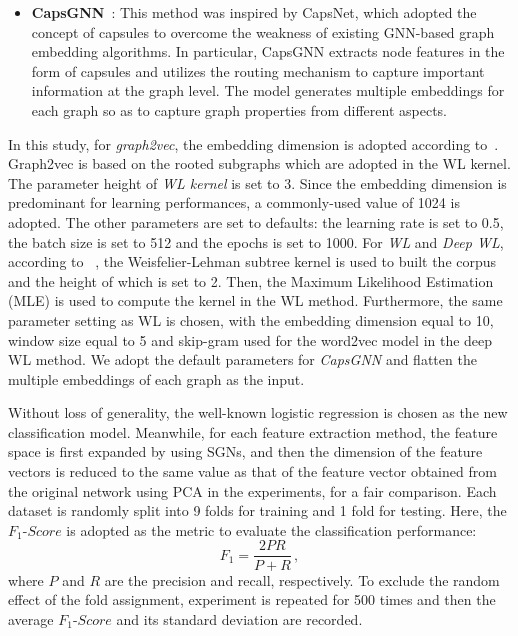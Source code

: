 \documentclass[10pt,journal,compsoc]{IEEEtran}
\begin{document}
\begin{itemize}
\item \textbf{CapsGNN}~\cite{xinyi2018capsule}: This method was inspired by CapsNet, which adopted the concept of capsules to overcome the weakness of existing GNN-based graph embedding algorithms. In particular, CapsGNN extracts node features in the form of capsules and utilizes the routing mechanism to capture important information at the graph level. The model generates multiple embeddings for each graph so as to capture graph properties from different aspects.
\end{itemize}



In this study, for \emph{graph2vec}, the embedding dimension is adopted  according to~\cite{narayanan2017graph2vec}. Graph2vec is based on the rooted subgraphs which are adopted in the WL kernel. The parameter height of \emph{WL kernel} is set to 3. Since the embedding dimension is predominant for learning performances, a commonly-used value of 1024 is adopted. The other parameters are set to defaults: the learning rate is set to 0.5, the batch size is set to 512 and the epochs is set to 1000. For \emph{WL} and \emph{Deep WL}, according to ~\cite{yanardag2015deep}, the Weisfelier-Lehman subtree kernel is used to built the corpus and the height of which is set to 2. Then, the Maximum Likelihood Estimation (MLE) is used to compute the kernel in the WL method. Furthermore, the same parameter setting as WL is chosen, with the embedding dimension equal to 10, window size equal to 5 and skip-gram used for the word2vec model in the deep WL method. We adopt the default parameters for \emph{CapsGNN} and flatten the multiple embeddings of each graph as the input.

Without loss of generality, the well-known logistic regression is chosen as the new classification model. Meanwhile, for each feature extraction method, the feature space is first expanded by using SGNs, and then the dimension of the feature vectors is reduced to the same value as that of the feature vector obtained from the original network using PCA in the experiments, for a fair comparison. Each dataset is randomly split into 9 folds for training and 1 fold for testing. Here, the $F_1$-$Score$ is adopted as the metric to evaluate the classification performance:
\begin{equation}
F_{1}= \frac{2PR}{P + R}\,,
\end{equation}
where $P$ and $R$ are the precision and recall, respectively. To exclude the random effect of the fold assignment, experiment is repeated for 500 times and then the average $F_1$-$Score$ and its standard deviation are recorded.
\end{document}
